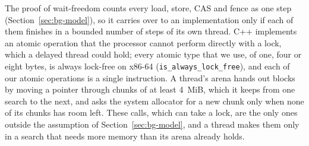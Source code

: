 The proof of wait-freedom counts every load, store, CAS and fence as one step (Section~\ref{sec:bg-model}), so it carries over to an implementation only if each of them finishes in a bounded number of steps of its own thread. C++ implements an atomic operation that the processor cannot perform directly with a lock, which a delayed thread could hold; every atomic type that we use, of one, four or eight bytes, is always lock-free on x86-64 (\texttt{is\_always\_lock\_free}), and each of our atomic operations is a single instruction. A thread's arena hands out blocks by moving a pointer through chunks of at least 4~MiB, which it keeps from one search to the next, and asks the system allocator for a new chunk only when none of its chunks has room left. These calls, which can take a lock, are the only ones outside the assumption of Section~\ref{sec:bg-model}, and a thread makes them only in a search that needs more memory than its arena already holds.
